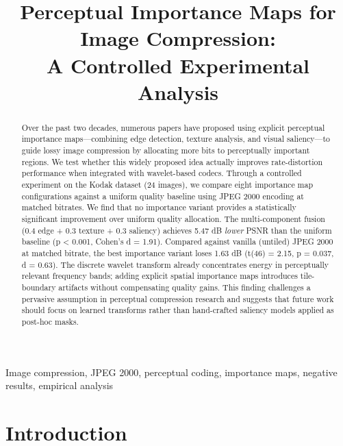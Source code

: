 \documentclass[conference]{IEEEtran}
\begin{document}
\title{Perceptual Importance Maps for Image Compression:\\
A Controlled Experimental Analysis}

\author{
}

\maketitle

\begin{abstract}
Over the past two decades, numerous papers have proposed using explicit
perceptual importance maps---combining edge detection, texture analysis,
and visual saliency---to guide lossy image compression by allocating more
bits to perceptually important regions. We test whether this widely proposed
idea actually improves rate-distortion performance when integrated with
wavelet-based codecs. Through a controlled experiment on the Kodak dataset
(24 images), we compare eight importance map configurations against a uniform
quality baseline using JPEG 2000 encoding at matched bitrates. We find that
no importance variant provides a statistically significant improvement over
uniform quality allocation. The multi-component fusion (0.4 edge + 0.3 texture
+ 0.3 saliency) achieves 5.47 dB \textit{lower} PSNR than the uniform baseline
(p < 0.001, Cohen's d = 1.91). Compared against vanilla (untiled) JPEG 2000
at matched bitrate, the best importance variant loses 1.63 dB
(t(46) = 2.15, p = 0.037, d = 0.63). The discrete wavelet transform already
concentrates energy in perceptually relevant frequency bands; adding explicit
spatial importance maps introduces tile-boundary artifacts without compensating
quality gains. This finding challenges a pervasive assumption in perceptual
compression research and suggests that future work should focus on learned
transforms rather than hand-crafted saliency models applied as post-hoc masks.
\end{abstract}

\begin{IEEEkeywords}
Image compression, JPEG 2000, perceptual coding, importance maps, negative results, empirical analysis
\end{IEEEkeywords}

\section{Introduction}
\end{document}
